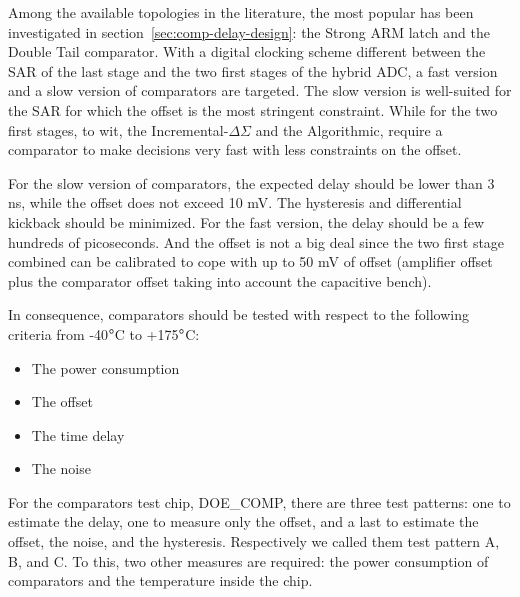 Among the available topologies in the literature, the most popular has been investigated in section~\ref{sec:comp-delay-design}: the Strong ARM latch and the Double Tail comparator. With a digital clocking scheme different between the SAR of the last stage and the two first stages of the hybrid ADC, a fast version and a slow version of comparators are targeted. The slow version is well-suited for the SAR for which the offset is the most stringent constraint. While for the two first stages, to wit, the Incremental-\(\Delta \Sigma\) and the Algorithmic, require a comparator to make decisions very fast with less constraints on the offset.

For the slow version of comparators, the expected delay should be lower than 3 ns, while the offset does not exceed 10 mV. The hysteresis and differential kickback should be minimized. For the fast version, the delay should be a few hundreds of picoseconds. And the offset is not a big deal since the two first stage combined can be calibrated to cope with up to 50 mV of offset (amplifier offset plus the comparator offset taking into account the capacitive bench).

In consequence, comparators should be tested with respect to the following criteria from -40\(\degree\)C to +175\(\degree\)C\@:
\begin{itemize}
\item The power consumption
\item The offset
\item The time delay
\item The noise
\end{itemize}

For the comparators test chip, DOE\_COMP, there are three test patterns: one to estimate the delay, one to measure only the offset, and a last to estimate the offset, the noise, and the hysteresis. Respectively we called them test pattern A, B, and C. To this, two other measures are required: the power consumption of comparators and the temperature inside the chip. 


